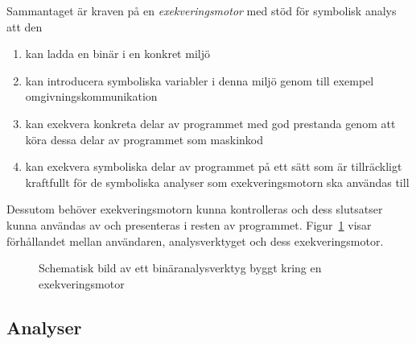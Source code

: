 Sammantaget är kraven på en \textit{exekveringsmotor} med stöd för symbolisk
analys att den \begin{enumerate} \item kan ladda en binär i en konkret miljö
		\item kan introducera symboliska variabler i denna miljö genom till
			exempel omgivningskommunikation \item kan exekvera konkreta delar av
			programmet med god prestanda genom att köra dessa delar av
		programmet som maskinkod \item kan exekvera symboliska delar av
			programmet på ett sätt som är tillräckligt kraftfullt för de
			symboliska analyser som exekveringsmotorn ska användas till
\end{enumerate} Dessutom behöver exekveringsmotorn kunna kontrolleras och dess
slutsatser kunna användas av och presenteras i resten av programmet.
Figur~\ref{schematic} visar förhållandet mellan användaren, analysverktyget och
dess exekveringsmotor.

\begin{figure}[H] \centering {} \caption{ Schematisk bild av ett binäranalysverktyg byggt
	kring en exekveringsmotor }\label{schematic} \end{figure}

\subsection{Analyser}

